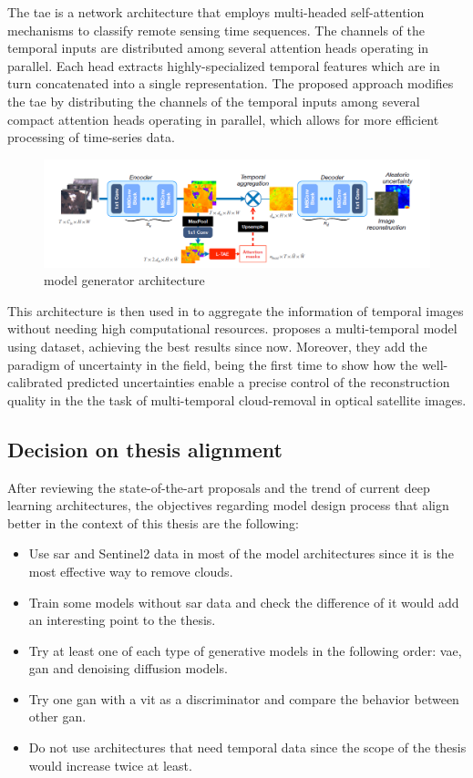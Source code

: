 \documentclass[11pt, a4paper]{article}
\begin{document}
	The  \gls{tae} is a network architecture that employs multi-headed self-attention mechanisms to classify remote sensing time sequences. The channels of the temporal inputs are distributed among several attention heads operating in parallel. Each head extracts highly-specialized temporal features which are in turn concatenated into a single representation. The proposed approach modifies the \gls{tae} by distributing the channels of the temporal inputs among several compact attention heads operating in parallel, which allows for more efficient processing of time-series data. 
	\begin{figure}[H]
		\centering
		\includegraphics[width=15cm]{imgs/relatedwork/uncertainty}
		\caption{\cite{uncrtaints2021ebel} model generator architecture}
	\end{figure}
	This architecture is then used in \cite{uncrtaints2021ebel} to aggregate the information of temporal images without needing high computational resources. \cite{uncrtaints2021ebel} proposes a multi-temporal model using \cite{sen12mscrts} dataset, achieving the best results since now. Moreover, they add the paradigm of uncertainty in the field, being the first time to show how the well-calibrated predicted uncertainties
	enable a precise control of the reconstruction quality in the the task of multi-temporal
	cloud-removal in optical satellite images.

	\subsection{Decision on thesis alignment}
	After reviewing the state-of-the-art proposals and the trend of current deep learning architectures, the objectives regarding model design process that align better in the context of this thesis are the following:
	\begin{itemize}
		\item Use \gls{sar} and Sentinel2 data in most of the model architectures since it is the most effective way to remove clouds.
		\item Train some models without \gls{sar} data and check the difference of it would add an interesting point to the thesis.
		\item Try at least one of each type of generative models in the following order: \gls{vae}, \gls{gan} and denoising diffusion models.
		\item Try one \gls{gan} with a \gls{vit} as a discriminator and compare the behavior between other \gls{gan}.
		\item Do not use architectures that need temporal data since the scope of the thesis would increase twice at least.
	\end{itemize}
\end{document}
